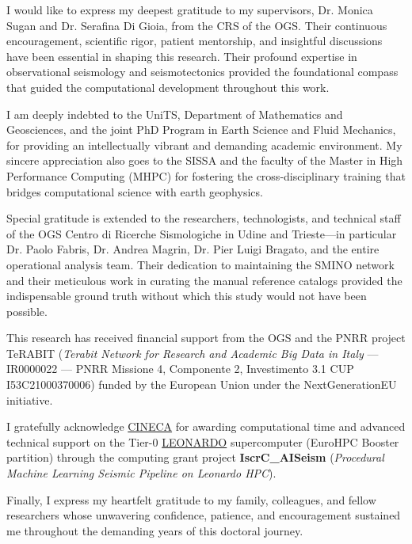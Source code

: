 
\label{chap:Acknowledgement}

I would like to express my deepest gratitude to my supervisors, Dr. Monica Sugan and Dr. Serafina Di Gioia, from the \acf{CRS} of the \acf{OGS}. Their continuous encouragement, scientific rigor, patient mentorship, and insightful discussions have been essential in shaping this research. Their profound expertise in observational seismology and seismotectonics provided the foundational compass that guided the computational development throughout this work.

I am deeply indebted to the \acf{UniTS}, Department of Mathematics and Geosciences, and the joint PhD Program in Earth Science and Fluid Mechanics, for providing an intellectually vibrant and demanding academic environment. My sincere appreciation also goes to the \acf{SISSA} and the faculty of the Master in High Performance Computing (MHPC) for fostering the cross-disciplinary training that bridges computational science with earth geophysics.

Special gratitude is extended to the researchers, technologists, and technical staff of the OGS Centro di Ricerche Sismologiche in Udine and Trieste—in particular Dr. Paolo Fabris, Dr. Andrea Magrin, Dr. Pier Luigi Bragato, and the entire operational analysis team. Their dedication to maintaining the \ac{SMINO} network and their meticulous work in curating the manual reference catalogs provided the indispensable ground truth without which this study would not have been possible.

This research has received financial support from the \acf{OGS} and the \acf{PNRR} project \acf{TeRABIT} (\textit{Terabit Network for Research and Academic Big Data in Italy} --- IR0000022 --- PNRR Missione 4, Componente 2, Investimento 3.1 CUP I53C21000370006) funded by the European Union under the NextGenerationEU initiative.

I gratefully acknowledge \href{https://www.cineca.it/en}{CINECA} for awarding computational time and advanced technical support on the Tier-0 \href{https://wiki.u-gov.it/confluence/display/SCAIUS/UG3.2.1\%3A+LEONARDO+Booster+UserGuide}{LEONARDO} supercomputer (EuroHPC Booster partition) through the computing grant project \textbf{IscrC\_AISeism} (\textit{Procedural Machine Learning Seismic Pipeline on Leonardo HPC}).

Finally, I express my heartfelt gratitude to my family, colleagues, and fellow researchers whose unwavering confidence, patience, and encouragement sustained me throughout the demanding years of this doctoral journey.
